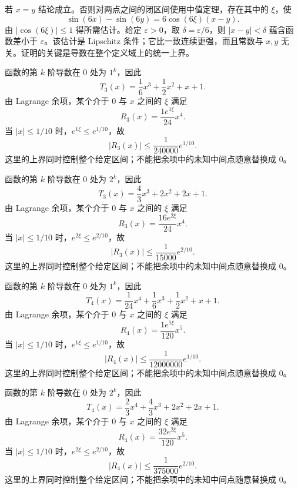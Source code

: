 \documentclass[UTF8,12pt,a4paper,fontset=fandol]{ctexart}
\begin{document}
\begin{solve}\label{ans:c10q13}
若 $x=y$ 结论成立。否则对两点之间的闭区间使用中值定理，存在其中的 $\xi$，使
\[
\sin(6x)-\sin(6y)=6\cos(6\xi)(x-y).
\]
由 $|\cos(6\xi)|\le1$ 得所需估计。给定 $\varepsilon>0$，取 $\delta=\varepsilon/6$，则 $|x-y|<\delta$ 蕴含函数差小于 $\varepsilon$。该估计是 Lipschitz 条件；它比一致连续更强，而且常数与 $x,y$ 无关。证明的关键是导数在整个定义域上的统一上界。
\end{solve}

\begin{solve}\label{ans:c10q14}
函数的第 $k$ 阶导数在 $0$ 处为 $1^k$，因此
\[
T_{3}(x)=\frac{1}{6}x^{3}+\frac{1}{2}x^{2}+x+1.
\]
由 Lagrange 余项，某个介于 $0$ 与 $x$ 之间的 $\xi$ 满足
\[
R_{3}(x)=\frac{1e^{1\xi}}{24}x^{4}.
\]
当 $|x|\le1/10$ 时，$e^{1\xi}\le e^{1/10}$，故
\[
|R_{3}(x)|\le \frac{1}{240000}e^{1/10}.
\]
这里的上界同时控制整个给定区间；不能把余项中的未知中间点随意替换成 $0$。
\end{solve}

\begin{solve}\label{ans:c10q15}
函数的第 $k$ 阶导数在 $0$ 处为 $2^k$，因此
\[
T_{3}(x)=\frac{4}{3}x^{3}+2x^{2}+2x+1.
\]
由 Lagrange 余项，某个介于 $0$ 与 $x$ 之间的 $\xi$ 满足
\[
R_{3}(x)=\frac{16e^{2\xi}}{24}x^{4}.
\]
当 $|x|\le1/10$ 时，$e^{2\xi}\le e^{2/10}$，故
\[
|R_{3}(x)|\le \frac{1}{15000}e^{2/10}.
\]
这里的上界同时控制整个给定区间；不能把余项中的未知中间点随意替换成 $0$。
\end{solve}

\begin{solve}\label{ans:c10q16}
函数的第 $k$ 阶导数在 $0$ 处为 $1^k$，因此
\[
T_{4}(x)=\frac{1}{24}x^{4}+\frac{1}{6}x^{3}+\frac{1}{2}x^{2}+x+1.
\]
由 Lagrange 余项，某个介于 $0$ 与 $x$ 之间的 $\xi$ 满足
\[
R_{4}(x)=\frac{1e^{1\xi}}{120}x^{5}.
\]
当 $|x|\le1/10$ 时，$e^{1\xi}\le e^{1/10}$，故
\[
|R_{4}(x)|\le \frac{1}{12000000}e^{1/10}.
\]
这里的上界同时控制整个给定区间；不能把余项中的未知中间点随意替换成 $0$。
\end{solve}

\begin{solve}\label{ans:c10q17}
函数的第 $k$ 阶导数在 $0$ 处为 $2^k$，因此
\[
T_{4}(x)=\frac{2}{3}x^{4}+\frac{4}{3}x^{3}+2x^{2}+2x+1.
\]
由 Lagrange 余项，某个介于 $0$ 与 $x$ 之间的 $\xi$ 满足
\[
R_{4}(x)=\frac{32e^{2\xi}}{120}x^{5}.
\]
当 $|x|\le1/10$ 时，$e^{2\xi}\le e^{2/10}$，故
\[
|R_{4}(x)|\le \frac{1}{375000}e^{2/10}.
\]
这里的上界同时控制整个给定区间；不能把余项中的未知中间点随意替换成 $0$。
\end{solve}
\end{document}
